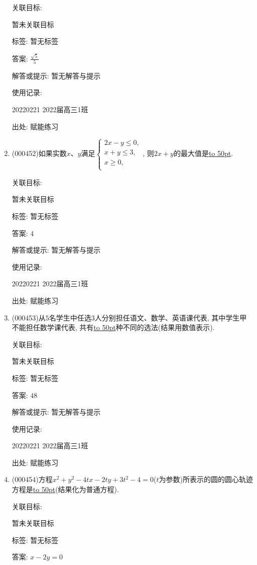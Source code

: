 \documentclass[10pt,a4paper]{article}
\newcommand{\blank}[1]{\underline{\hbox to #1pt{}}}
\begin{document}
\begin{enumerate}[1.]
关联目标:

暂未关联目标



标签: 暂无标签

答案: $\frac{\sqrt 5}5$

解答或提示: 暂无解答与提示

使用记录:

20220221	2022届高三1班	


出处: 赋能练习
\item { (000452)}如果实数$x$、$y$满足$\begin{cases} 2x-y\le 0, \\ x+y\le 3, \\  x\ge 0, \\ \end{cases}$, 则$2x+y$的最大值是\blank{50}.


关联目标:

暂未关联目标



标签: 暂无标签

答案: $4$

解答或提示: 暂无解答与提示

使用记录:

20220221	2022届高三1班	


出处: 赋能练习
\item { (000453)}从$5$名学生中任选$3$人分别担任语文、数学、英语课代表, 其中学生甲不能担任数学课代表, 共有\blank{50}种不同的选法(结果用数值表示).


关联目标:

暂未关联目标



标签: 暂无标签

答案: $48$

解答或提示: 暂无解答与提示

使用记录:

20220221	2022届高三1班	


出处: 赋能练习
\item { (000454)}方程$x^2+y^2-4tx-2ty+3t^2-4=0$($t$为参数)所表示的圆的圆心轨迹方程是\blank{50}(结果化为普通方程).


关联目标:

暂未关联目标



标签: 暂无标签

答案: $x-2y=0$


\end{enumerate}
\end{document}
